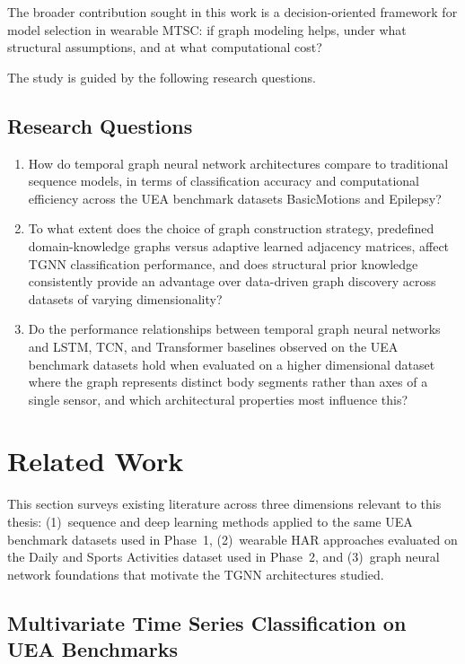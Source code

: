 \documentclass[11pt,a4paper]{article}
\begin{document}
The broader contribution sought in this work is a decision-oriented framework for model selection in wearable MTSC: if graph modeling helps, under what structural assumptions, and at what computational cost?

The study is guided by the following research questions.

\subsection*{Research Questions}
\begin{enumerate}[label=\textbf{RQ\arabic*:},leftmargin=*]
  \item How do temporal graph neural network architectures compare to traditional sequence models, in terms of classification accuracy and computational efficiency across the UEA benchmark datasets BasicMotions and Epilepsy?
  \item To what extent does the choice of graph construction strategy, predefined domain-knowledge graphs versus adaptive learned adjacency matrices, affect TGNN classification performance, and does structural prior knowledge consistently provide an advantage over data-driven graph discovery across datasets of varying dimensionality?
  \item Do the performance relationships between temporal graph neural networks and LSTM, TCN, and Transformer baselines observed on the UEA benchmark datasets hold when evaluated on a higher dimensional dataset where the graph represents distinct body segments rather than axes of a single sensor, and which architectural properties most influence this?
\end{enumerate}

\newpage
\section{Related Work}

This section surveys existing literature across three dimensions relevant to this thesis: (1)~sequence and deep learning methods applied to the same UEA benchmark datasets used in Phase~1, (2)~wearable HAR approaches evaluated on the Daily and Sports Activities dataset used in Phase~2, and (3)~graph neural network foundations that motivate the TGNN architectures studied.

\subsection{Multivariate Time Series Classification on UEA Benchmarks}
\end{document}
